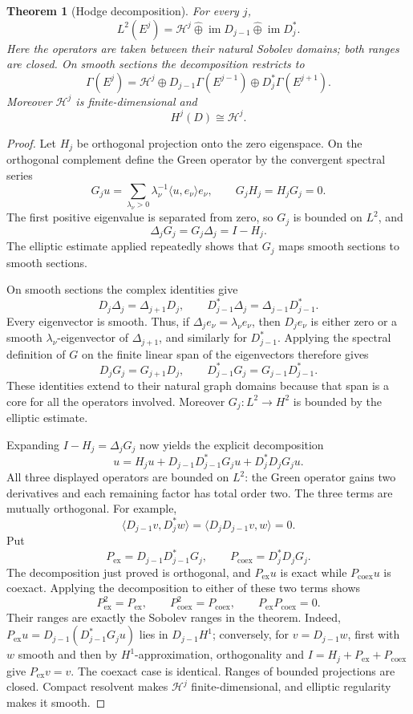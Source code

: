 \documentclass[11pt,oneside,reqno]{book}
\theoremstyle{plain}
\newtheorem{theorem}{Theorem}[chapter]
\theoremstyle{definition}
\theoremstyle{remark}
\begin{document}
\begin{theorem}[Hodge decomposition]
For every \(j\),
\[
 L^2(E^j)
 =
 \mathcal H^j
 \mathbin{\widehat\oplus}
 \operatorname{im}D_{j-1}
 \mathbin{\widehat\oplus}
 \operatorname{im}D_j^*.
\]
Here the operators are taken between their natural Sobolev domains; both
ranges are closed.  On smooth sections the decomposition restricts to
\[
 \Gamma(E^j)
 =\mathcal H^j\oplus D_{j-1}\Gamma(E^{j-1})
                  \oplus D_j^*\Gamma(E^{j+1}).
\]
Moreover \(\mathcal H^j\) is finite-dimensional and
\[
 H^j(D)\cong\mathcal H^j.
\]
\end{theorem}

\begin{proof}
Let \(H_j\) be orthogonal projection onto the zero eigenspace.  On the
orthogonal complement define the Green operator by the convergent
spectral series
\[
 G_ju=\sum_{\lambda_\nu>0}
       \lambda_\nu^{-1}\langle u,e_\nu\rangle e_\nu,
 \qquad G_jH_j=H_jG_j=0.
\]
The first positive eigenvalue is separated from zero, so \(G_j\) is
bounded on \(L^2\), and
\[
 \Delta_jG_j=G_j\Delta_j=I-H_j.
\]
The elliptic estimate applied repeatedly shows that \(G_j\) maps smooth
sections to smooth sections.

On smooth sections the complex identities give
\[
 D_j\Delta_j=\Delta_{j+1}D_j,
 \qquad
 D_{j-1}^*\Delta_j=\Delta_{j-1}D_{j-1}^*.
\]
Every eigenvector is smooth.  Thus, if \(\Delta_je_\nu=\lambda_\nu e_\nu\),
then \(D_je_\nu\) is either zero or a smooth \(\lambda_\nu\)-eigenvector
of \(\Delta_{j+1}\), and similarly for \(D_{j-1}^*\).  Applying the
spectral definition of \(G\) on the finite linear span of the eigenvectors
therefore gives
\[
 D_jG_j=G_{j+1}D_j,
 \qquad
 D_{j-1}^*G_j=G_{j-1}D_{j-1}^*.
\]
These identities extend to their natural graph domains because that span
is a core for all the operators involved.  Moreover
\(G_j:L^2\to H^2\) is bounded by the elliptic estimate.

Expanding \(I-H_j=\Delta_jG_j\) now yields the explicit decomposition
\[
 u=H_ju+D_{j-1}D_{j-1}^*G_ju+D_j^*D_jG_ju.
\]
All three displayed operators are bounded on \(L^2\): the Green operator
gains two derivatives and each remaining factor has total order two.  The
three terms are mutually orthogonal.  For example,
\[
 \langle D_{j-1}v,D_j^*w\rangle
 =\langle D_jD_{j-1}v,w\rangle=0.
\]
Put
\[
 P_{\mathrm{ex}}=D_{j-1}D_{j-1}^*G_j,
 \qquad
 P_{\mathrm{coex}}=D_j^*D_jG_j.
\]
The decomposition just proved is orthogonal, and
\(P_{\mathrm{ex}}u\) is exact while \(P_{\mathrm{coex}}u\) is coexact.
Applying the decomposition to either of these two terms shows
\[
 P_{\mathrm{ex}}^2=P_{\mathrm{ex}},\qquad
 P_{\mathrm{coex}}^2=P_{\mathrm{coex}},\qquad
 P_{\mathrm{ex}}P_{\mathrm{coex}}=0.
\]
Their ranges are exactly the Sobolev ranges in the theorem.  Indeed,
\(P_{\mathrm{ex}}u=D_{j-1}(D_{j-1}^*G_ju)\) lies in
\(D_{j-1}H^1\); conversely, for \(v=D_{j-1}w\), first with \(w\) smooth
and then by \(H^1\)-approximation, orthogonality and
\(I=H_j+P_{\mathrm{ex}}+P_{\mathrm{coex}}\) give
\(P_{\mathrm{ex}}v=v\).  The coexact case is identical.  Ranges of
bounded projections are closed.  Compact resolvent makes
\(\mathcal H^j\) finite-dimensional, and elliptic regularity makes it
smooth.


\end{proof}
\end{document}
